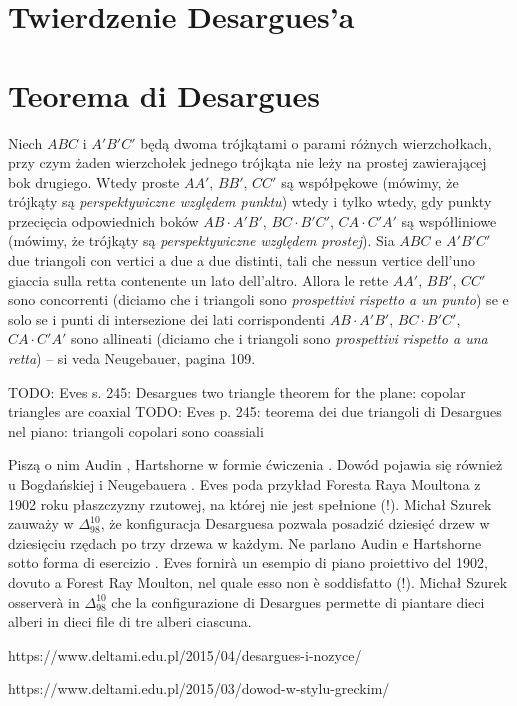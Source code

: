 %

\section{Twierdzenie Desargues'a} %
\section{Teorema di Desargues} %

\begin{proposition}
[twierdzenie Desargues'a] %
[teorema di Desargues] %
    Niech $ABC$ i $A'B'C'$ będą dwoma trójkątami o parami różnych wierzchołkach, przy czym żaden wierzchołek jednego trójkąta nie leży na prostej zawierającej bok drugiego. %
    Wtedy proste $AA'$, $BB'$, $CC'$ są współpękowe (mówimy, że trójkąty są \emph{perspektywiczne względem punktu}) wtedy i tylko wtedy, gdy punkty przecięcia odpowiednich boków $AB \cdot A'B'$, $BC \cdot B'C'$, $CA \cdot C'A'$ są współliniowe (mówimy, że trójkąty są \emph{perspektywiczne względem prostej}). %
    Sia $ABC$ e $A'B'C'$ due triangoli con vertici a due a due distinti, tali che nessun vertice dell'uno giaccia sulla retta contenente un lato dell'altro. %
    Allora le rette $AA'$, $BB'$, $CC'$ sono concorrenti (diciamo che i triangoli sono \emph{prospettivi rispetto a un punto}) se e solo se i punti di intersezione dei lati corrispondenti $AB \cdot A'B'$, $BC \cdot B'C'$, $CA \cdot C'A'$ sono allineati (diciamo che i triangoli sono \emph{prospettivi rispetto a una retta}) -- si veda Neugebauer, pagina 109. %

    TODO: Eves s. 245: Desargues two triangle theorem for the plane: copolar triangles are coaxial %
    TODO: Eves p. 245: teorema dei due triangoli di Desargues nel piano: triangoli copolari sono coassiali %
\end{proposition}

Piszą o nim Audin \cite[s. 26, 151]{audin_2003}, Hartshorne w formie ćwiczenia \cite[s. 183]{hartshorne_2000}. %
Dowód pojawia się również u Bogdańskiej i Neugebauera \cite[s. 109, 111]{neugebauer_2018}.
Eves \cite[s. 362]{eves1_1972} poda przykład Foresta Raya Moultona z 1902 roku płaszczyzny rzutowej, na której nie jest spełnione (!). %
Michał Szurek zauważy w $\Delta_{98}^{10}$, że konfiguracja Desarguesa pozwala posadzić dziesięć drzew w dziesięciu rzędach po trzy drzewa w każdym. %
Ne parlano Audin \cite[p. 26, 151]{audin_2003} e Hartshorne sotto forma di esercizio \cite[p. 183]{hartshorne_2000}. %
Eves \cite[p. 362]{eves1_1972} fornirà un esempio di piano proiettivo del 1902, dovuto a Forest Ray Moulton, nel quale esso non è soddisfatto (!). %
Michał Szurek osserverà in $\Delta_{98}^{10}$ che la configurazione di Desargues permette di piantare dieci alberi in dieci file di tre alberi ciascuna. %

https://www.deltami.edu.pl/2015/04/desargues-i-nozyce/

https://www.deltami.edu.pl/2015/03/dowod-w-stylu-greckim/

%